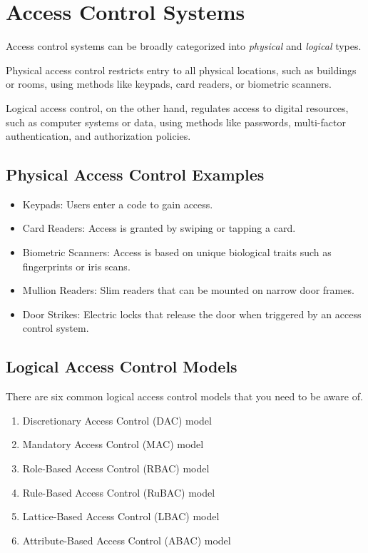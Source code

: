 \chapter{Access Control Systems}
Access control systems can be broadly categorized into \textit{physical} and \textit{logical} types. 

Physical access control restricts entry to all physical locations, such as buildings or rooms, using methods like keypads, card readers, or biometric scanners.

Logical access control, on the other hand, regulates access to digital resources, such as computer systems or data, using methods like passwords, multi-factor authentication, and authorization policies.

\section{Physical Access Control Examples}
\begin{itemize}
    \item Keypads: Users enter a code to gain access.
    \item Card Readers: Access is granted by swiping or tapping a card.
    \item Biometric Scanners: Access is based on unique biological traits such as fingerprints or iris scans.
    \item Mullion Readers: Slim readers that can be mounted on narrow door frames.
    \item Door Strikes: Electric locks that release the door when triggered by an access control system.
\end{itemize}

\section{Logical Access Control Models}
There are six common logical access control models that you need to be aware of. 
\begin{enumerate}
    \item Discretionary Access Control (DAC) model
    \item Mandatory Access Control (MAC) model
    \item Role-Based Access Control (RBAC) model
    \item Rule-Based Access Control (RuBAC) model
    \item Lattice-Based Access Control (LBAC) model
    \item Attribute-Based Access Control (ABAC) model
\end{enumerate}

